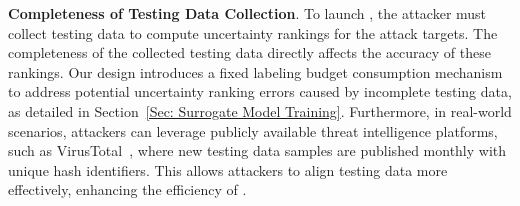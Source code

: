 \textbf{Completeness of Testing Data Collection}.
To launch \pandora, the attacker must collect testing data to compute uncertainty rankings for the attack targets.
The completeness of the collected testing data directly affects the accuracy of these rankings.
Our design introduces a fixed labeling budget consumption mechanism to address potential uncertainty ranking errors caused by incomplete testing data, as detailed in Section~\ref{Sec: Surrogate Model Training}.
Furthermore, in real-world scenarios, attackers can leverage publicly available threat intelligence platforms, such as VirusTotal~\cite{Virustotaluploadinterface}, where new testing data samples are published monthly with unique hash identifiers.
This allows attackers to align testing data more effectively, enhancing the efficiency of \pandora.

%
